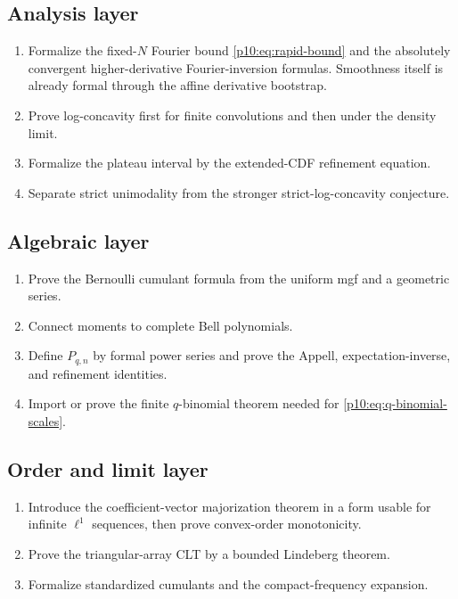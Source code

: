 \documentclass[11pt]{article}
\numberwithin{equation}{section}
\theoremstyle{definition}
\theoremstyle{remark}
\begin{document}
\subsection{Analysis layer}

\begin{enumerate}
\item Formalize the fixed-$N$ Fourier bound \eqref{p10:eq:rapid-bound} and the absolutely
      convergent higher-derivative Fourier-inversion formulas.  Smoothness itself is already
      formal through the affine derivative bootstrap.
\item Prove log-concavity first for finite convolutions and then under the density limit.
\item Formalize the plateau interval by the extended-CDF refinement equation.
\item Separate strict unimodality from the stronger strict-log-concavity conjecture.
\end{enumerate}

\subsection{Algebraic layer}

\begin{enumerate}
\item Prove the Bernoulli cumulant formula from the uniform mgf and a geometric series.
\item Connect moments to complete Bell polynomials.
\item Define $P_{q,n}$ by formal power series and prove the Appell, expectation-inverse, and
      refinement identities.
\item Import or prove the finite $q$-binomial theorem needed for
      \eqref{p10:eq:q-binomial-scales}.
\end{enumerate}

\subsection{Order and limit layer}

\begin{enumerate}
\item Introduce the coefficient-vector majorization theorem in a form usable for infinite
      $\ell^1$ sequences, then prove convex-order monotonicity.
\item Prove the triangular-array CLT by a bounded Lindeberg theorem.
\item Formalize standardized cumulants and the compact-frequency expansion.
\end{enumerate}
\end{document}
